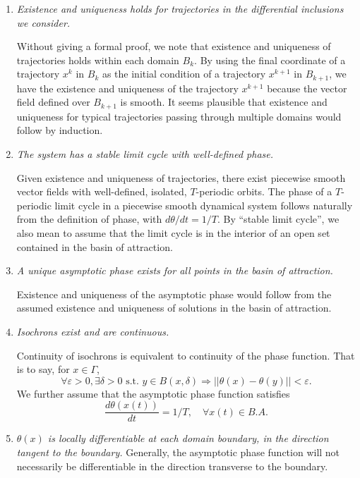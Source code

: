 \documentclass[12pt]{article}
\begin{document}
\begin{enumerate}
 \item \textit{Existence and uniqueness holds for trajectories in the differential inclusions we consider.}
 
 Without giving a formal proof, we note that existence and uniqueness of trajectories holds within each domain $B_k$. By using the final coordinate of a trajectory $x^k$ in $B_k$ as the initial condition of a trajectory $x^{k+1}$ in $B_{k+1}$, we have the existence and uniqueness of the trajectory $x^{k+1}$ because the vector field defined over $B_{k+1}$ is smooth.  It seems plausible that existence and uniqueness for typical trajectories passing through multiple domains would follow by induction.
 
 \item \textit{The system has a stable limit cycle with well-defined phase.}
 
 Given existence and uniqueness of trajectories, there exist piecewise smooth vector fields with well-defined, isolated, $T$-periodic orbits. The phase of a $T$-periodic limit cycle in a piecewise smooth dynamical system follows naturally from the definition of phase, with $d\theta/dt = 1/T$.  By ``stable limit cycle'', we also mean to assume that the limit cycle is in the interior of an open set contained in the basin of attraction.
 
 \item \textit{A unique asymptotic phase exists for all points in the basin of attraction.}
 
 Existence and uniqueness of the asymptotic phase would follow from the assumed existence and uniqueness of solutions in the basin of attraction.
 
 \item \textit{Isochrons exist and are continuous.}
 
 Continuity of isochrons is equivalent to continuity of the phase function.  That is to say, for $x \in \Gamma$,
\begin{equation}
 \forall \varepsilon > 0, \exists \delta >0 \text{ s.t. } y \in B(x,\delta) \Rightarrow ||\theta(x)-\theta(y)|| < \varepsilon.
\end{equation}
We further assume that the asymptotic phase function satisfies
\begin{equation}
\frac{d\theta(x(t))}{dt} = 1/T, \quad \forall x(t) \in B.A.
\end{equation}
 
 \item \textit{$\theta(x)$ is locally differentiable at each domain boundary, in the direction tangent to the boundary.}
  Generally, the asymptotic phase function will not necessarily be differentiable in the direction transverse to the boundary.
\end{enumerate}
\end{document}
